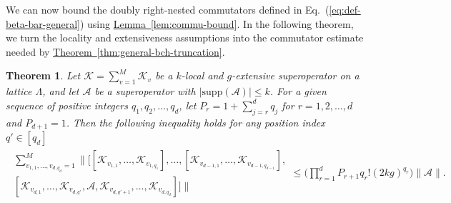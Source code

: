 \documentclass[11pt]{article}
\newtheorem{theorem}{Theorem}
\newcommand{\eq}[1]{(\ref{eq:#1})}
\newcommand{\thm}[1]{\hyperref[thm:#1]{Theorem~\ref*{thm:#1}}}
\newcommand{\lem}[1]{\hyperref[lem:#1]{Lemma~\ref*{lem:#1}}}
\newcommand{\supp}{\mathrm{supp}}
\newcommand{\mc}{\mathcal}
\begin{document}
We can now bound the doubly right-nested commutators defined in Eq.~\eq{def-beta-bar-general} using \lem{commu-bound}. In the following theorem, we turn the locality and extensiveness assumptions into the commutator estimate needed by \thm{general-bch-truncation}.
\begin{theorem}\label{thm:doubly-nested-bound}
    Let $\mathcal{K} = \sum_{v=1}^{M} \mathcal{K}_{v}$ be a $k$-local and $g$-extensive superoperator on a lattice $\Lambda$, and let $\mathcal{A}$ be a superoperator with $|\supp(\mc A)|\le k$. For a given sequence of positive integers $q_1, q_2, \ldots, q_d$, let $P_{r} = 1+\sum_{j=r}^{d} q_j$ for $r=1, 2, \ldots, d$ and $P_{d+1}=1$. Then the following inequality holds for any position index $q' \in [q_d]$
    \begin{align}
    \label{eq:double-comm-k-local}
        \begin{multlined}
            \sum_{v_{1,1}, \ldots, v_{d, q_d}=1}^{M} \bigg\| \Big[ [\mathcal{K}_{v_{1,1}}, \ldots, \mathcal{K}_{v_{1, q_1}}], \ldots, [\mathcal{K}_{v_{d-1,1}}, \ldots, \mathcal{K}_{v_{d-1, q_{d-1}}}], \\
        [\mathcal{K}_{v_{d,1}}, \ldots, \mathcal{K}_{v_{d, q'}}, \mathcal{A}, \mathcal{K}_{v_{d, q'+1}}, \ldots, \mathcal{K}_{v_{d, q_d}}] \Big] \bigg\| 
        \end{multlined}\le \bigg(\prod_{r=1}^{d}P_{r+1} q_r!(2kg)^{q_r}\bigg)\|\mc A\|.
    \end{align}
\end{theorem}
\end{document}
